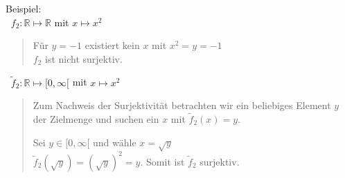 Beispiel:\\
\textbullet $\;\;f_2:\mathbb{R}\longmapsto\mathbb{R}$ mit $x\longmapsto x^2$\\
\begin{quote}
	Für $y=-1$ existiert kein $x$ mit $x^2=y=-1$\\
	$f_2$ ist nicht surjektiv.\vspace*{2mm}\\
\end{quote}

\textbullet$\;\;\widetilde{f}_2: \mathbb{R}\longmapsto [0,\infty[$ mit $x\longmapsto x^2$\\
\begin{quote}
	Zum Nachweis der Surjektivität betrachten wir ein beliebiges Element $y$ der Zielmenge und suchen ein $x$ mit $\widetilde{f}_2(x)=y$.
	
	Sei $y\in [0,\infty[$ und wähle $ x=\sqrt{y} $\\
	$\widetilde{f}_2(\sqrt{y})=(\sqrt{y})^2=y$. Somit ist $\widetilde{f}_2$ surjektiv.
	
\end{quote}

